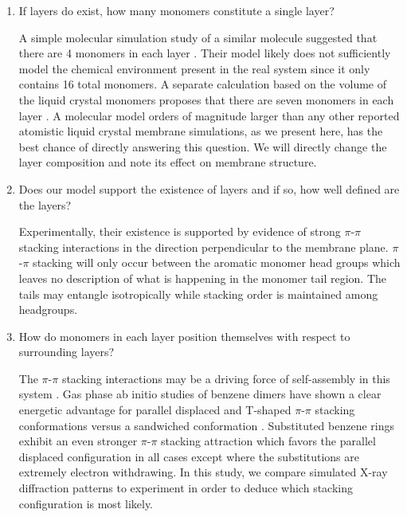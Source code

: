 \documentclass{article}
\begin{document}
  \begin{enumerate}

  \item If layers do exist, how many monomers constitute a single layer? \label{point:monomernum}
  
  A simple molecular simulation study of a similar molecule suggested that
  there are 4 monomers in each layer \cite{zhu_methacrylated_2006}. Their 
  model likely does not sufficiently model the chemical environment present
  in the real system since it only contains 16 total monomers.
  A separate calculation based on the volume of the liquid crystal monomers
  proposes that there are seven monomers in each layer
  \cite{resel_structural_2000}.  A molecular model orders of magnitude larger
  than any other reported atomistic liquid crystal membrane simulations, as we
  present here, has the best chance of directly answering this question.  We will
  directly change the layer composition and note its effect on membrane
  structure.

 \item Does our model support the existence of layers and if so, how well
 defined are the layers? \label{point:layers} 

  Experimentally, their existence is supported by evidence of strong $\pi$-$\pi$
  stacking interactions in the direction perpendicular to the membrane plane.
  $\pi$-$\pi$ stacking will only occur between the aromatic monomer head groups
  which leaves no description of what is happening in the monomer tail region.
  The tails may entangle isotropically while stacking order is maintained among
  headgroups. 

  \item How do monomers in each layer position themselves with respect to
  surrounding layers? \label{point:orientation}

  The $\pi$-$\pi$ stacking interactions may be a driving force of self-assembly
  in this system \cite{gazit_possible_2002}. Gas phase ab initio studies of
  benzene dimers have shown a clear energetic advantage for parallel displaced
  and T-shaped $\pi$-$\pi$ stacking conformations versus a sandwiched
  conformation \cite{sinnokrot_estimates_2002}. Substituted benzene rings
  exhibit an even stronger $\pi$-$\pi$ stacking attraction which favors the
  parallel displaced configuration in all cases except where the substitutions
  are extremely electron withdrawing.
  \cite{waller_hybrid_2006,ringer_effect_2006} In this study, we compare
  simulated X-ray diffraction patterns to experiment in order to deduce which
  stacking configuration is most likely. 


\end{enumerate}
\end{document}
